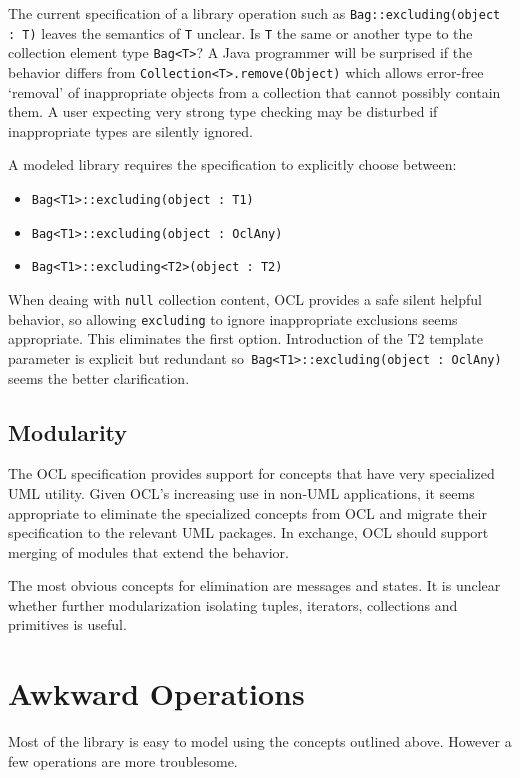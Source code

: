 \documentclass{eceasst}
\begin{document}
The current specification of a library operation such as \verb|Bag::excluding(object : T)| leaves the semantics of \verb|T| unclear. Is \verb|T| the same or another type to the collection element type \verb|Bag<T>|? A Java programmer will be surprised if the behavior differs from \verb|Collection<T>.remove(Object)| which allows error-free `removal' of inappropriate objects from a collection that cannot possibly contain them. A user expecting very strong type checking may be disturbed if inappropriate types are silently ignored.

A modeled library requires the specification to explicitly choose between:

\begin{itemize}
\item \verb|Bag<T1>::excluding(object : T1)|
\item \verb|Bag<T1>::excluding(object : OclAny)|
\item \verb|Bag<T1>::excluding<T2>(object : T2)|
\end{itemize}

When deaing with \verb|null| collection content, OCL provides a safe silent helpful behavior, so allowing \verb|excluding| to ignore inappropriate exclusions seems appropriate. This eliminates the first option. Introduction of the T2 template parameter is explicit but redundant so\verb| Bag<T1>::excluding(object : OclAny)| seems the better clarification.

\subsection{Modularity}

The OCL specification provides support for concepts that have very specialized UML utility. Given OCL's increasing use in non-UML applications, it seems appropriate to eliminate the specialized concepts from OCL and migrate their specification to the relevant UML packages. In exchange, OCL should support merging of modules that extend the behavior.

The most obvious concepts for elimination are messages and states. It is unclear whether further modularization isolating tuples, iterators, collections and primitives is useful.

\section{Awkward Operations}\label{AwkwardOperations}

Most of the library is easy to model using the concepts outlined above. However a few operations are more troublesome.
\end{document}

